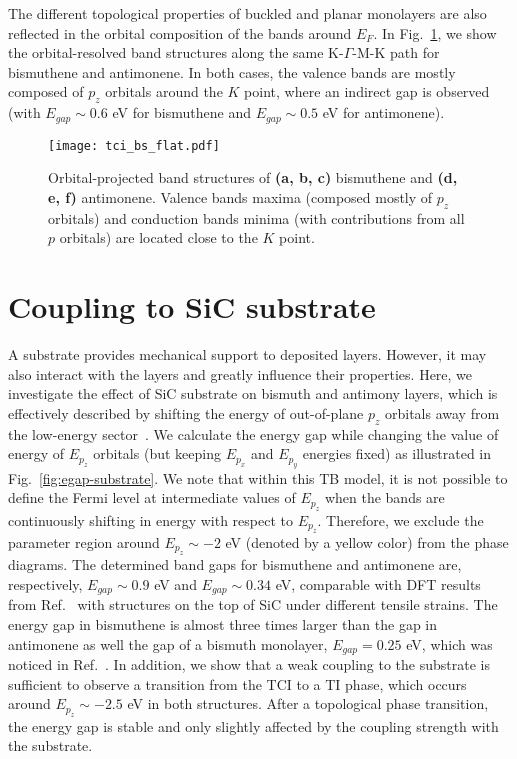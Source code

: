 The different topological properties of buckled and planar monolayers are also reflected in the orbital composition of the bands around $E_F$. In Fig.~\ref{fig:bs-anti-bism}, we show the orbital-resolved band structures along the same K-$\Gamma$-M-K path for bismuthene and antimonene. In both cases, the valence bands are mostly composed of $p_z$ orbitals around the $K$ point, where an indirect gap is observed (with $E_{gap} \sim 0.6$ eV for bismuthene and $E_{gap} \sim 0.5$ eV for antimonene).

\begin{figure}[H]
\centering
\texttt{[image: tci\_bs\_flat.pdf]}
\caption[Orbital-projected band structures of free-standing bismuthene and antimonene]{Orbital-projected band structures of \textbf{(a, b, c)} bismuthene and \textbf{(d, e, f)} antimonene. Valence bands maxima (composed mostly of $p_z$ orbitals) and conduction bands minima (with contributions from all $p$ orbitals) are located close to the $K$ point.}
\label{fig:bs-anti-bism}
\end{figure}

\section{Coupling to SiC substrate}
\label{sec:sic}
A substrate provides mechanical support to deposited layers. However, it may also interact with the layers and greatly influence their properties. Here, we investigate the effect of SiC substrate on bismuth and antimony layers, which is effectively described by shifting the energy of out-of-plane $p_z$ orbitals away from the low-energy sector~\cite{Reis287}. We calculate the energy gap while changing the value of energy of $E_{p_z}$ orbitals (but keeping $E_{p_x}$ and $E_{p_y}$ energies fixed) as illustrated in Fig.~\ref{fig:egap-substrate}. We note that within this TB model, it is not possible to define the Fermi level at intermediate values of $E_{p_z}$ when the bands are continuously shifting in energy with respect to $E_{p_z}$. Therefore, we exclude the parameter region around $E_{p_z} \sim - 2$ eV (denoted by a yellow color) from the phase diagrams. The determined band gaps for bismuthene and antimonene are, respectively, $E_{gap} \sim 0.9$ eV and $E_{gap} \sim 0.34$ eV, comparable with DFT results from Ref.~\cite{Hsu_2015} with structures on the top of SiC under different tensile strains. The energy gap in bismuthene is almost three times larger than the gap in antimonene as well the gap of a bismuth monolayer, $E_{gap} = 0.25$ eV, which was noticed in Ref.~\cite{Reis287}. In addition, we show that a weak coupling to the substrate is sufficient to observe a transition from the TCI to a TI phase, which occurs around $E_{p_z} \sim - 2.5$ eV in both structures. After a topological phase transition, the energy gap is stable and only slightly affected by the coupling strength with the substrate.

